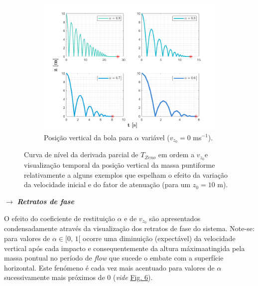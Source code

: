 \begin{figure}[ht]
\begin{subfigure}[b]{0.33\linewidth}
        \label{fig:matrixvelo} 
    \end{subfigure}%
    \begin{subfigure}[b]{0.33\linewidth}
        \centering
        \includegraphics[width=1\linewidth]{img/P1/P1-coefmatrix.png}
        \caption{Posição vertical da bola para $\alpha$ variável ($v_{z_0} = 0$ ms$^{-1}$).} 
        \label{fig:matrixcoef} 
    \end{subfigure}%
    \caption{Curva de nível da derivada parcial de $T_{Zeno}$ em ordem a $v_{z_0}$\protect\footnotemark[2] e visualização temporal da posição vertical da massa puntiforme relativamente a alguns exemplos que espelham o efeito da variação da velocidade inicial e do fator de atenuação (para um $z_0 = 10$ m).}
\end{figure}

\renewcommand*{\thefootnote}{\arabic{footnote}}

\clearpage
\noindent $\pmb{\rightarrow}$ \textbf{\textit{Retratos de fase}}

\noindent O efeito do coeficiente de restituição $\alpha$ e de $v_{z_0}$ são apresentados condensadamente através da visualização dos retratos de fase do sistema. Note-se: para valores de $\alpha\in [0,\, 1[$ ocorre uma diminuição (expectável) da velocidade vertical após cada impacto e consequentemente da altura máxima\footnotemark[8] atingida pela massa pontual no período de \textit{flow} que sucede o embate com a superfície horizontal. Este fenómeno é cada vez mais acentuado para valores de $\alpha$ sucessivamente mais próximos de $0$ (\textit{vide} \hyperref[fig:phase-portrait-limites]{Fig. 6}).


